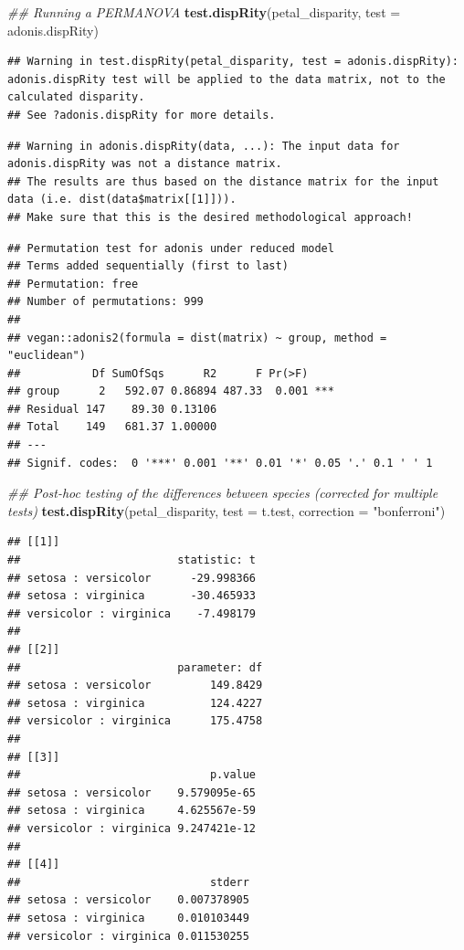 \documentclass[
]{book}
\newenvironment{Shaded}{\begin{snugshade}}{\end{snugshade}}
\newcommand{\CommentTok}[1]{\textcolor[rgb]{0.56,0.35,0.01}{\textit{#1}}}
\newcommand{\DataTypeTok}[1]{\textcolor[rgb]{0.13,0.29,0.53}{#1}}
\newcommand{\KeywordTok}[1]{\textcolor[rgb]{0.13,0.29,0.53}{\textbf{#1}}}
\newcommand{\NormalTok}[1]{#1}
\newcommand{\StringTok}[1]{\textcolor[rgb]{0.31,0.60,0.02}{#1}}
\begin{document}
\begin{Shaded}
\begin{Highlighting}[]
\CommentTok{\#\# Running a PERMANOVA}
\KeywordTok{test.dispRity}\NormalTok{(petal\_disparity, }\DataTypeTok{test =}\NormalTok{ adonis.dispRity)}
\end{Highlighting}
\end{Shaded}

\begin{verbatim}
## Warning in test.dispRity(petal_disparity, test = adonis.dispRity): adonis.dispRity test will be applied to the data matrix, not to the calculated disparity.
## See ?adonis.dispRity for more details.
\end{verbatim}

\begin{verbatim}
## Warning in adonis.dispRity(data, ...): The input data for adonis.dispRity was not a distance matrix.
## The results are thus based on the distance matrix for the input data (i.e. dist(data$matrix[[1]])).
## Make sure that this is the desired methodological approach!
\end{verbatim}

\begin{verbatim}
## Permutation test for adonis under reduced model
## Terms added sequentially (first to last)
## Permutation: free
## Number of permutations: 999
## 
## vegan::adonis2(formula = dist(matrix) ~ group, method = "euclidean")
##           Df SumOfSqs      R2      F Pr(>F)    
## group      2   592.07 0.86894 487.33  0.001 ***
## Residual 147    89.30 0.13106                  
## Total    149   681.37 1.00000                  
## ---
## Signif. codes:  0 '***' 0.001 '**' 0.01 '*' 0.05 '.' 0.1 ' ' 1
\end{verbatim}

\begin{Shaded}
\begin{Highlighting}[]
\CommentTok{\#\# Post{-}hoc testing of the differences between species (corrected for multiple tests)}
\KeywordTok{test.dispRity}\NormalTok{(petal\_disparity, }\DataTypeTok{test =}\NormalTok{ t.test, }\DataTypeTok{correction =} \StringTok{"bonferroni"}\NormalTok{)}
\end{Highlighting}
\end{Shaded}

\begin{verbatim}
## [[1]]
##                        statistic: t
## setosa : versicolor      -29.998366
## setosa : virginica       -30.465933
## versicolor : virginica    -7.498179
## 
## [[2]]
##                        parameter: df
## setosa : versicolor         149.8429
## setosa : virginica          124.4227
## versicolor : virginica      175.4758
## 
## [[3]]
##                             p.value
## setosa : versicolor    9.579095e-65
## setosa : virginica     4.625567e-59
## versicolor : virginica 9.247421e-12
## 
## [[4]]
##                             stderr
## setosa : versicolor    0.007378905
## setosa : virginica     0.010103449
## versicolor : virginica 0.011530255
\end{verbatim}
\end{document}
